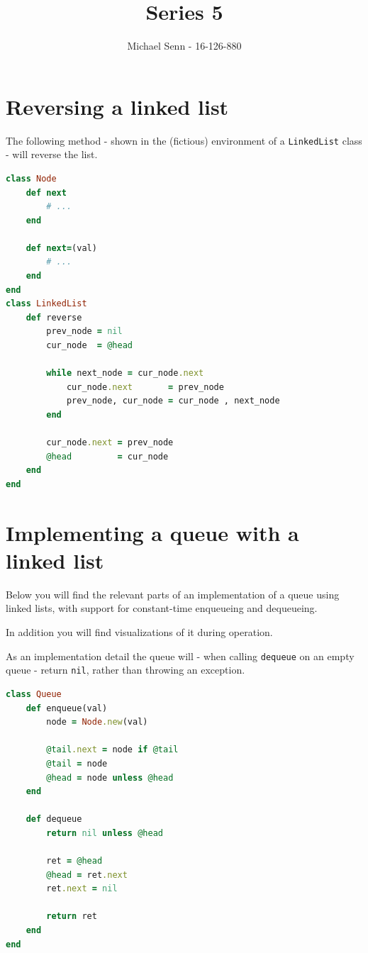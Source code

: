 \documentclass[a4paper]{scrartcl}
\title{Series 5}
\author{Michael Senn - 16-126-880}
\date{}
\begin{document}
\maketitle

\section{Reversing a linked list}

The following method - shown in the (fictious) environment of a \texttt{LinkedList}
class - will reverse the list.

\begin{lstlisting}[language=ruby]
class Node
    def next
        # ...
    end

    def next=(val)
        # ...
    end
end
class LinkedList
    def reverse
        prev_node = nil 
        cur_node  = @head

        while next_node = cur_node.next
            cur_node.next       = prev_node
            prev_node, cur_node = cur_node , next_node
        end 

        cur_node.next = prev_node
        @head         = cur_node
    end
end
\end{lstlisting}



\section{Implementing a queue with a linked list}

Below you will find the relevant parts of an implementation of a queue using
linked lists, with support for constant-time enqueueing and dequeueing.

In addition you will find visualizations of it during operation.

As an implementation detail the queue will - when calling \texttt{dequeue} on
an empty queue - return \texttt{nil}, rather than throwing an exception.

\begin{lstlisting}[language=ruby]
class Queue
    def enqueue(val)
        node = Node.new(val)

        @tail.next = node if @tail
        @tail = node
        @head = node unless @head
    end

    def dequeue
        return nil unless @head

        ret = @head
        @head = ret.next
        ret.next = nil

        return ret
    end
end
\end{lstlisting}
\end{document}
